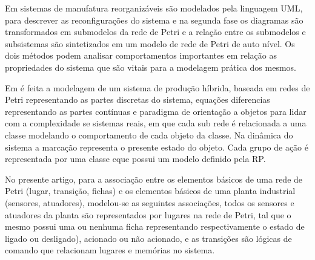 Em 
sistemas de manufatura reorganizáveis são modelados pela linguagem UML, para descrever as reconfigurações do sistema e na segunda fase  os diagramas são transformados em submodelos da rede de Petri e a relação entre os submodelos e subsistemas são sintetizados em um modelo de rede de Petri de auto nível. Os dois métodos podem analisar comportamentos importantes em relação as propriedades do sistema que são vitais para a modelagem prática dos mesmos.

Em 
é feita a modelagem de um sistema de produção híbrida, baseada em redes de Petri representando as partes discretas do sistema, equações diferencias representando as partes contínuas e paradigma de orientação a objetos para lidar com a complexidade se sistemas reais, em que cada sub rede é relacionada a uma classe modelando o comportamento de cada objeto da classe. Na dinâmica do sistema a marcação representa o presente estado do objeto. Cada grupo de ação é representada por uma classe eque possui um modelo definido pela RP. 

No presente artigo, para a associação entre os elementos básicos de uma rede de Petri (lugar, transição, fichas) e os elementos básicos de uma planta industrial (sensores, atuadores), modelou-se as seguintes associações, todos os sensores e atuadores da planta são representados por lugares na rede de Petri, tal que o mesmo possui uma ou nenhuma ficha representando respectivamente o estado de ligado ou desligado), acionado ou não acionado, e as transições são lógicas de comando que relacionam lugares e memórias no sistema. 



\usepackage[options]{circuitikz}


\begin{comment}   

\section{Objetivos}
\subsection{Objetivos gerais}


\subsection{Objetivos específicos}
\begin{itemize}
    \item Modelagem ... ;
    \item Abordagem ...;
    \item Implementação ....; 
\end{itemize}

\end{comment}

